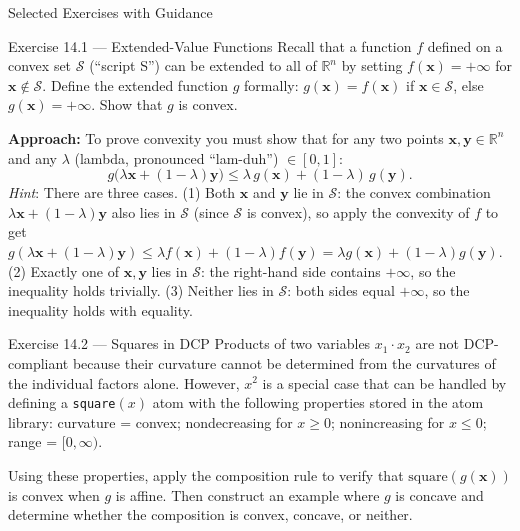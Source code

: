 \documentclass[aspectratio=169,10pt]{beamer}
\begin{document}
\begin{frame}[allowframebreaks]{Selected Exercises with Guidance}

  \begin{block}{Exercise 14.1 --- Extended-Value Functions}
    Recall that a function $f$ defined on a convex set $\mathcal{S}$
    (``script S'') can be extended to all of $\mathbb{R}^n$ by setting
    $f(\mathbf{x}) = +\infty$ for $\mathbf{x} \notin \mathcal{S}$.
    Define the extended function $g$ formally:
    $g(\mathbf{x}) = f(\mathbf{x})$ if $\mathbf{x} \in \mathcal{S}$,
    else $g(\mathbf{x}) = +\infty$.  Show that $g$ is convex.

    \textbf{Approach:} To prove convexity you must show that for any
    two points $\mathbf{x}, \mathbf{y} \in \mathbb{R}^n$ and any
    $\lambda$ (lambda, pronounced ``lam-duh'') $\in [0,1]$:
    \[
      g\bigl(\lambda\mathbf{x} + (1-\lambda)\mathbf{y}\bigr) \leq
      \lambda\, g(\mathbf{x}) + (1-\lambda)\,g(\mathbf{y}).
    \]
    \textit{Hint}: There are three cases.  (1) Both $\mathbf{x}$ and
    $\mathbf{y}$ lie in $\mathcal{S}$: the convex combination
    $\lambda\mathbf{x}+(1-\lambda)\mathbf{y}$ also lies in
    $\mathcal{S}$ (since $\mathcal{S}$ is convex), so apply the
    convexity of $f$ to get $g(\lambda\mathbf{x}+(1-\lambda)\mathbf{y})
    \leq \lambda f(\mathbf{x}) + (1-\lambda)f(\mathbf{y}) = \lambda
    g(\mathbf{x}) + (1-\lambda)g(\mathbf{y})$.  (2) Exactly one of
    $\mathbf{x}, \mathbf{y}$ lies in $\mathcal{S}$: the right-hand side
    contains $+\infty$, so the inequality holds trivially.  (3) Neither
    lies in $\mathcal{S}$: both sides equal $+\infty$, so the inequality
    holds with equality.
  \end{block}

  \begin{block}{Exercise 14.2 --- Squares in DCP}
    Products of two variables $x_1 \cdot x_2$ are not DCP-compliant
    because their curvature cannot be determined from the curvatures of
    the individual factors alone.  However, $x^2$ is a special case
    that can be handled by defining a \texttt{square}$(x)$ atom with
    the following properties stored in the atom library: curvature =
    convex; nondecreasing for $x \geq 0$; nonincreasing for $x \leq
    0$; range = $[0, \infty)$.

    Using these properties, apply the composition rule to verify that
    $\mathrm{square}(g(\mathbf{x}))$ is convex when $g$ is affine.
    Then construct an example where $g$ is concave and determine
    whether the composition is convex, concave, or neither.


\end{block}
\end{frame}
\end{document}
